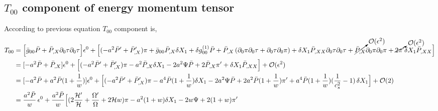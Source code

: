 \documentclass[a4paper,14pt]{article}
\begin{document}
\subsection{$T_{00}$ component of energy momentum tensor}
According to previous equation $T_{00} $ component is,
\begin{align} \label{T00}
T_{00} &=
   \Big[ \bar{g}_{0 0} \bar{P} 
+
 \bar{P}_{,X} \partial_{0} \tau \partial_{0} \tau \Big] \epsilon ^0 
+
\Big[( -a^2 \bar{P}' +\bar{P}'_{,X})\pi+\bar{g}_{0 0}  \bar{P}_{,X} \delta X_1 
+
 \delta g^{(1)}_{0 0} \bar{P} 
 +
  \bar{P}_{,X}  \left ( \partial_{0} \pi \partial_{0} \tau  
  +
  \partial_{0} \tau \partial_{0} \pi  \right ) 
  +
   \delta X_1 \bar{P}_{,XX}   \partial_{0} \tau \partial_{0} \tau 
   +
    \cancelto{\mathcal {O}(\epsilon^{2}) 
} { \bar{P}_{,X}  } \partial_{0} \pi \partial_{0} \pi  +   \cancelto{\mathcal {O}(\epsilon^{2})}  {2 \pi'   } \delta X_1  \bar{P}_{,XX}  \Big ]
  \nonumber
 \\
  &
  =
  [-a^2  \bar{P} 
+
 \bar{P}_{,X}  ] \epsilon ^0 
+
\Big[ (-a^2 \bar{P}' +\bar{P}'_{,X} )\pi- a^2 \bar{P}_{,X} \delta X_1 
-
 2 a^2 \Psi \bar{P} 
 +
 2 \bar{P}_{,X}   {\pi'}
  +
   \delta X_1 \bar{P}_{,XX} 
  \Big ] 
+ \mathcal {O}(\epsilon^{2}) 
  \nonumber
 \\
  &
  =
  [-a^2 \bar{P} 
+
a^2 \bar{P}  (1+\frac{1}{w}) ] \epsilon ^0 
+
\Big[(-a^2 \bar{P}' +\bar{P}'_{,X} ) \pi- a^4 \bar{P}  (1+\frac{1}{w})  \delta X_1 
-
 2 a^2  \Psi \bar{P} 
 +
 2  a^2 \bar{P}  (1+\frac{1}{w})  {\pi'}
  +
  a^4 \bar{P}  (1+\frac{1}{w}) (\frac{1}{c_s^2}-1) \,   \delta X_1 
   \Big ] 
+ \mathcal {O}(2) 
  \nonumber
 \\
  &
  =
 \frac{ a^2 \bar{P}}{w} \,\epsilon ^0 
+
\frac{ a^2\bar{ P}}{w}   \Big[ (2 \frac{\mathcal{H}'}{\mathcal{H}}+ \frac{\Omega'}{\Omega} + 2 \mathcal{H} w ) \pi- a^2   (1+w)  \delta X_1 
-
 2   w \Psi
 +
 2  (1+w)  {\pi'}

\end{align}
\end{document}
